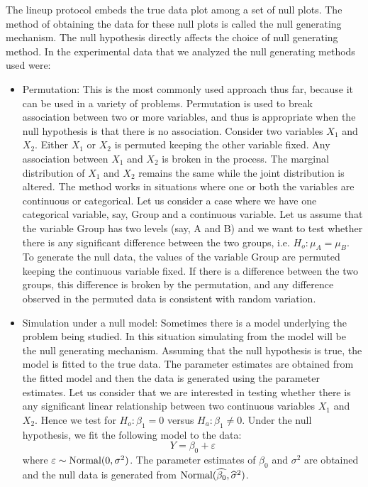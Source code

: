 \documentclass[12]{article}
\begin{document}
The lineup protocol embeds the true data plot among a set of null plots. The method of obtaining the data for these null plots is called the null generating mechanism. %
The null hypothesis directly affects the choice of null generating method. In the experimental data that we analyzed the null generating methods used were:
\begin{itemize}
\item Permutation: This is the most commonly used approach thus far, because it  can be used in a variety of problems. Permutation is used to break association between two or more variables, and thus is appropriate when the null hypothesis is that there is no association. Consider two variables $X_1$ and $X_2$. Either $X_1$ or $X_2$ is permuted keeping the other variable fixed. Any association between $X_1$ and $X_2$ is broken in the process. The marginal distribution of $X_1$ and $X_2$ remains the same while the joint distribution is altered. The method works in situations where one or both the variables are continuous or categorical. Let us consider a case where we have one categorical variable, say, Group and a continuous variable. Let us assume that the variable Group has two levels (say, A and B) and we want to test whether there is any significant difference between the two groups, i.e. $H_o: \mu_A = \mu_B$. To generate the null data, the values of the variable Group are permuted keeping the continuous variable fixed. If there is a difference between the two groups, this difference is broken by the permutation, and any difference observed in the permuted data is consistent with random variation.
\item Simulation under a null model: Sometimes there is a model underlying the problem being studied. In this situation simulating from the model will be the null generating mechanism. Assuming that the null hypothesis is true, the model is fitted to the true data. The parameter estimates are obtained from the fitted model and then the data is generated using the parameter estimates. Let us consider that we are interested in testing whether there is any significant linear relationship between two continuous variables $X_1$ and $X_2$. Hence we test for $H_o : \beta_1 = 0$ versus $H_a: \beta_1 \ne 0$. Under the null hypothesis, we fit the following model to the data:
$$Y = \beta_0 + \varepsilon$$
where $\varepsilon \sim \hbox{Normal}(0, \sigma^2)$. The parameter estimates of $\beta_0$ and $\sigma^2$ are obtained and the null data is generated from $\hbox{Normal}(\widehat{\beta_0}, \widehat{\sigma}^2)$. 

\end{itemize}
\end{document}
